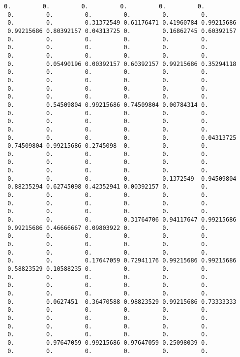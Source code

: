 \documentclass[11pt]{article}
\begin{document}
\begin{Verbatim}[commandchars=\\\{\}]
 0.         0.         0.         0.         0.         0.
 0.         0.         0.         0.         0.         0.
 0.         0.         0.31372549 0.61176471 0.41960784 0.99215686
 0.99215686 0.80392157 0.04313725 0.         0.16862745 0.60392157
 0.         0.         0.         0.         0.         0.
 0.         0.         0.         0.         0.         0.
 0.         0.         0.         0.         0.         0.
 0.         0.05490196 0.00392157 0.60392157 0.99215686 0.35294118
 0.         0.         0.         0.         0.         0.
 0.         0.         0.         0.         0.         0.
 0.         0.         0.         0.         0.         0.
 0.         0.         0.         0.         0.         0.
 0.         0.54509804 0.99215686 0.74509804 0.00784314 0.
 0.         0.         0.         0.         0.         0.
 0.         0.         0.         0.         0.         0.
 0.         0.         0.         0.         0.         0.
 0.         0.         0.         0.         0.         0.04313725
 0.74509804 0.99215686 0.2745098  0.         0.         0.
 0.         0.         0.         0.         0.         0.
 0.         0.         0.         0.         0.         0.
 0.         0.         0.         0.         0.         0.
 0.         0.         0.         0.         0.1372549  0.94509804
 0.88235294 0.62745098 0.42352941 0.00392157 0.         0.
 0.         0.         0.         0.         0.         0.
 0.         0.         0.         0.         0.         0.
 0.         0.         0.         0.         0.         0.
 0.         0.         0.         0.31764706 0.94117647 0.99215686
 0.99215686 0.46666667 0.09803922 0.         0.         0.
 0.         0.         0.         0.         0.         0.
 0.         0.         0.         0.         0.         0.
 0.         0.         0.         0.         0.         0.
 0.         0.         0.17647059 0.72941176 0.99215686 0.99215686
 0.58823529 0.10588235 0.         0.         0.         0.
 0.         0.         0.         0.         0.         0.
 0.         0.         0.         0.         0.         0.
 0.         0.         0.         0.         0.         0.
 0.         0.0627451  0.36470588 0.98823529 0.99215686 0.73333333
 0.         0.         0.         0.         0.         0.
 0.         0.         0.         0.         0.         0.
 0.         0.         0.         0.         0.         0.
 0.         0.         0.         0.         0.         0.
 0.         0.97647059 0.99215686 0.97647059 0.25098039 0.
 0.         0.         0.         0.         0.         0.

\end{Verbatim}
\end{document}
